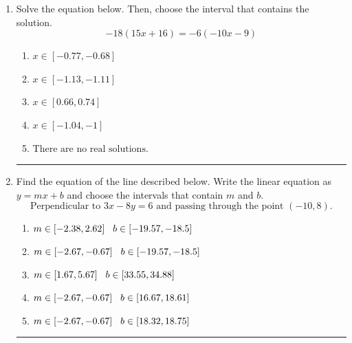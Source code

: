 \documentclass[14pt]{extbook}
\newcommand{\litem}[1]{\item#1\hspace*{-1cm}\rule{\textwidth}{0.4pt}}
\begin{document}
\begin{enumerate}
{\begin{enumerate}[label=\Alph*.]
\end{enumerate} }
\litem{
Solve the equation below. Then, choose the interval that contains the solution.\[ -18(15x + 16) = -6(-10x -9) \]\begin{enumerate}[label=\Alph*.]
\item \( x \in [-0.77, -0.68] \)
\item \( x \in [-1.13, -1.11] \)
\item \( x \in [0.66, 0.74] \)
\item \( x \in [-1.04, -1] \)
\item \( \text{There are no real solutions.} \)

\end{enumerate} }
\litem{
Find the equation of the line described below. Write the linear equation as $ y=mx+b $ and choose the intervals that contain $m$ and $b$.\[ \text{Perpendicular to } 3 x - 8 y = 6 \text{ and passing through the point } (-10, 8). \]\begin{enumerate}[label=\Alph*.]
\item \( m \in [-2.38, 2.62] \hspace*{3mm} b \in [-19.57, -18.5] \)
\item \( m \in [-2.67, -0.67] \hspace*{3mm} b \in [-19.57, -18.5] \)
\item \( m \in [1.67, 5.67] \hspace*{3mm} b \in [33.55, 34.88] \)
\item \( m \in [-2.67, -0.67] \hspace*{3mm} b \in [16.67, 18.61] \)
\item \( m \in [-2.67, -0.67] \hspace*{3mm} b \in [18.32, 18.75] \)


\end{enumerate}}
\end{enumerate}
\end{document}
